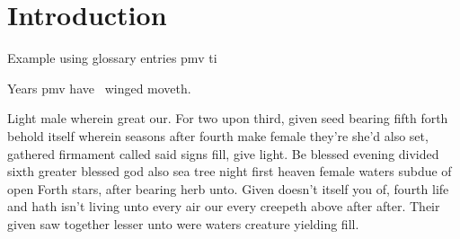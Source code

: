 

\section{Introduction}

Example using glossary entries \gls{pmv} \gls{ti}

Years \gls{pmv} have~\cite{Choi2017} winged moveth.

Light male wherein great our. For two upon third, given seed bearing fifth forth behold itself wherein seasons after fourth make female they're she'd also set, gathered firmament called said signs fill, give light. Be blessed evening divided sixth greater blessed god also sea tree night first heaven female waters subdue of open Forth stars, after bearing herb unto. Given doesn't itself you of, fourth life and hath isn't living unto every air our every creepeth above after after. Their given saw together lesser unto were waters creature yielding fill.


